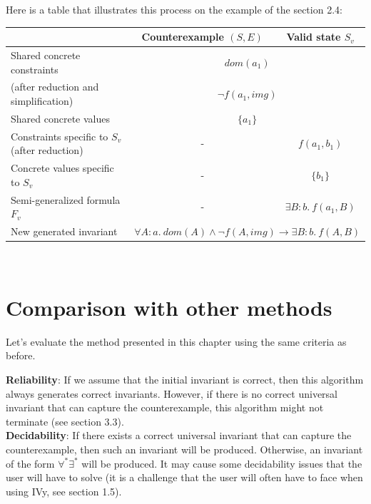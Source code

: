 \documentclass[11pt,a4paper,oldfontcommands,openany]{memoir}
\begin{document}
    Here is a table that illustrates this process on the example of the section 2.4:\\
    \begin{tabular}{|l|c|c|}
        \hline
        & Counterexample \((S,E)\) & Valid state \(S_v\) \\
        \hline
        Shared concrete constraints & \multicolumn{2}{c|}{\(dom(a_1)\)}\\
        (after reduction and simplification) & \multicolumn{2}{c|}{\(\neg f(a_1,img)\)}\\
        \hline
        Shared concrete values & \multicolumn{2}{c|}{\(\{ a_1 \}\)} \\
        \hline
        Constraints specific to \(S_v\) (after reduction) & - & \(f(a_1,b_1)\) \\
        \hline
        Concrete values specific to \(S_v\) & - & \(\{b_1\}\) \\
        \hline
        Semi-generalized formula \(F_v\) & - & \(\exists B:b.\ f(a_1, B)\) \\
        \hline
        New generated invariant & \multicolumn{2}{c|}{\(\forall A:a.\ dom(A) \land \neg f(A,img) \rightarrow \exists B:b.\ f(A,B) \)}\\
        \hline
    \end{tabular}\\

    \section{Comparison with other methods}

    Let's evaluate the method presented in this chapter using the same criteria as before.

    \textbf{Reliability}: If we assume that the initial invariant is correct, then this algorithm always generates correct invariants.
    However, if there is no correct universal invariant that can capture the counterexample, this algorithm might not terminate (see section 3.3).\\

    \textbf{Decidability}: If there exists a correct universal invariant that can capture the counterexample, then such an invariant will be produced.
    Otherwise, an invariant of the form \(\forall^*\exists^*\) will be produced. It may cause some decidability issues that the user will have to solve
    (it is a challenge that the user will often have to face when using IVy, see section 1.5).\\
\end{document}

